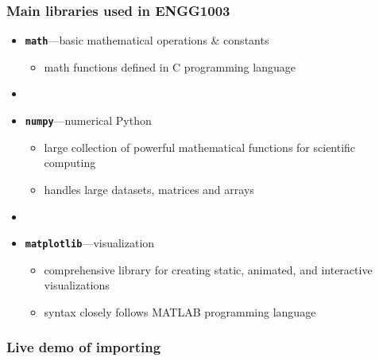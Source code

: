 \documentclass[14pt]{beamer}
\newcommand\red[1]{{\color{red} #1}}
\begin{document}

\begin{frame}[fragile]

\frametitle{Main libraries used in ENGG1003}
\begin{itemize}
	\item \red{\textbf{\texttt{math}}}---basic mathematical operations \& constants
	\begin{itemize}
		\item math functions defined in C programming language
	\end{itemize}
	\item[]
	\item \red{\textbf{\texttt{numpy}}}---numerical Python
	\begin{itemize}
		\item large collection of powerful mathematical functions for scientific computing
		\item handles large datasets, matrices and arrays
	\end{itemize}
	\item[]
	\item \red{\textbf{\texttt{matplotlib}}}---visualization
	\begin{itemize}
		\item comprehensive library for creating static, animated, and interactive visualizations
		\item syntax closely follows MATLAB programming language
	\end{itemize}


\end{itemize}

\end{frame}


\begin{frame}[fragile]

\frametitle{Live demo of importing}

\end{frame}

\end{document}
